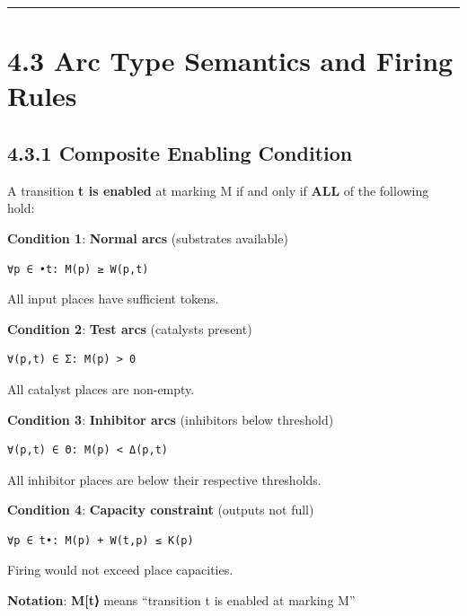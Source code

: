\begin{center}\rule{0.5\linewidth}{0.5pt}\end{center}

\hypertarget{arc-type-semantics-and-firing-rules}{%
\section{4.3 Arc Type Semantics and Firing
Rules}\label{arc-type-semantics-and-firing-rules}}

\hypertarget{composite-enabling-condition}{%
\subsection{4.3.1 Composite Enabling
Condition}\label{composite-enabling-condition}}

A transition \textbf{t is enabled} at marking M if and only if
\textbf{ALL} of the following hold:

\textbf{Condition 1}: \textbf{Normal arcs} (substrates available)

\begin{lstlisting}
∀p ∈ •t: M(p) ≥ W(p,t)
\end{lstlisting}

All input places have sufficient tokens.

\textbf{Condition 2}: \textbf{Test arcs} (catalysts present)

\begin{lstlisting}
∀(p,t) ∈ Σ: M(p) > 0
\end{lstlisting}

All catalyst places are non-empty.

\textbf{Condition 3}: \textbf{Inhibitor arcs} (inhibitors below
threshold)

\begin{lstlisting}
∀(p,t) ∈ Θ: M(p) < Δ(p,t)
\end{lstlisting}

All inhibitor places are below their respective thresholds.

\textbf{Condition 4}: \textbf{Capacity constraint} (outputs not full)

\begin{lstlisting}
∀p ∈ t•: M(p) + W(t,p) ≤ K(p)
\end{lstlisting}

Firing would not exceed place capacities.

\textbf{Notation}: \textbf{M{[}t⟩} means ``transition t is enabled at
marking M''

